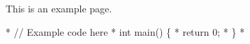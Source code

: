 This is an example page.


\begin{DoxyCode}
* \textcolor{comment}{// Example code here}
* \textcolor{keywordtype}{int} main() \{
*     \textcolor{keywordflow}{return} 0;
* \}
* 
\end{DoxyCode}
 